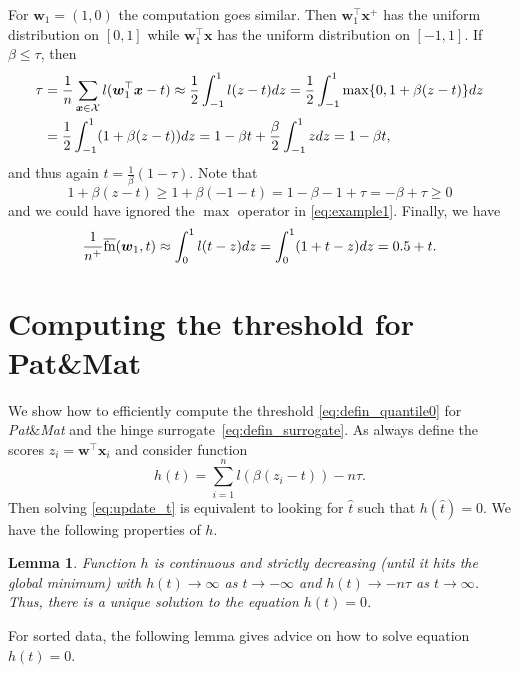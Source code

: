 \documentclass[]{interact}
\theoremstyle{plain}%
\newtheorem{lemma}[theorem]{Lemma}
\theoremstyle{definition}
\theoremstyle{remark}
\let\originalleft\left
\let\originalright\right
\renewcommand{\left}{\mathopen{}\mathclose\bgroup\originalleft}
\renewcommand{\right}{\aftergroup\egroup\originalright}
\newcommand{\apatmat}{Pat\&Mat\xspace}
\newcommand{\patmat}{\emph{Pat}\&\emph{Mat}\xspace}
\newcommand{\fns}{\overline{\textnormal{fn}}}
\newcommand{\Xcal}{\mathcal{X}}
\begin{document}
For $\bm w_1=(1,0)$ the computation goes similar. Then $\bm w_1^\top \bm x^+$ has the uniform distribution on $[0,1]$ while $\bm w_1^\top \bm x$ has the uniform distribution on $[-1,1]$. If $\beta\le\tau$, then
\begin{equation}\label{eq:example1}
\aligned
\tau &= \frac{1}{n}\sum_{\bm x\in\Xcal}l(\bm w_1^\top \bm x-t) \approx \frac12\int_{-1}^1 l(z-t)dz = \frac12\int_{-1}^1 \max\{0,1+\beta(z-t)\}dz \\
&=\frac12\int_{-1}^1 \left(1+\beta(z-t)\right)dz = 1-\beta t + \frac{\beta}{2}\int_{-1}^1zdz = 1-\beta t,
\endaligned
\end{equation}
and thus again $t=\frac{1}{\beta}(1-\tau)$. Note that
$$
1+\beta(z-t) \ge 1+\beta(-1-t) = 1-\beta - 1+\tau = -\beta+\tau \ge0
$$
and we could have ignored the $\max$ operator in \eqref{eq:example1}. Finally, we have
$$
\frac{1}{n^+}\fns(\bm w_1,t) \approx \int_0^1 l(t-z)dz = \int_0^1 \left(1+t-z\right)dz = 0.5+t.
$$


\section{Computing the threshold for \apatmat}\label{app:threshold}


We show how to efficiently compute the threshold \eqref{eq:defin_quantile0} for \patmat and the hinge surrogate~\eqref{eq:defin_surrogate}. As always define the scores $z_i=\bm w^\top \bm x_i$ and consider function
\begin{equation}\label{eq:defin_h}
h(t) = \sum_{i=1}^nl(\beta(z_i-t)) - n\tau.
\end{equation}
Then solving \eqref{eq:update_t} is equivalent to looking for $\hat t$ such that $h(\hat t)=0$. We have the following properties of $h$.

\begin{lemma}
Function $h$ is continuous and strictly decreasing (until it hits the global minimum) with $h(t)\to \infty$ as $t\to-\infty$ and $h(t)\to -n\tau$ as $t\to\infty$. Thus, there is a unique solution to the equation $h(t)=0$.
\end{lemma}

For sorted data, the following lemma gives advice on how to solve equation $h(t)=0$. 
\end{document}
